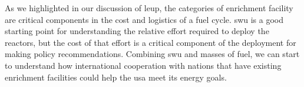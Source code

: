 As we highlighted in our discussion of \gls{leup}, the categories of enrichment facility are critical components in the cost and logistics of a fuel cycle. \gls{swu} is a good starting point for understanding the relative effort required to deploy the reactors, but the cost of that effort is a critical component of the deployment for making policy recommendations. Combining \gls{swu} and masses of fuel, we can start to understand how international cooperation with nations that have existing enrichment facilities could help the \gls{usa} meet its energy goals.

